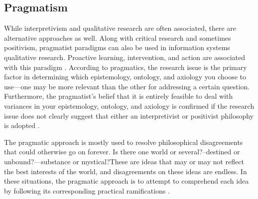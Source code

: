 \subsection{Pragmatism}
\par{While interpretivism and qualitative research are often associated, there are alternative approaches as well. Along with critical research and sometimes positivism, pragmatist paradigms can also be used in information systems qualitative research. Proactive learning, intervention, and action are associated with this paradigm \citep{goldkuhl2012pragmatism}. According to pragmatics, the research issue is the primary factor in determining which epistemology, ontology, and axiology you choose to use—one may be more relevant than the other for addressing a certain question. Furthermore, the pragmatist's belief that it is entirely feasible to deal with variances in your epistemology, ontology, and axiology is confirmed if the research issue does not clearly suggest that either an interpretivist or positivist philosophy is adopted \citep{saunders2003research}.}
\par{The pragmatic approach is mostly used to resolve philosophical disagreements that could otherwise go on forever. Is there one world or several?--destined or unbound?—substance or mystical?These are ideas that may or may not reflect the best interests of the world, and disagreements on these ideas are endless. In these situations, the pragmatic approach is to attempt to comprehend each idea by following its corresponding practical ramifications \citep{james2020pragmatism}.}
